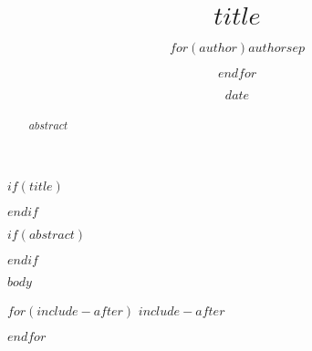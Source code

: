 \documentclass[twoside,symmetric]{tufte-handout}
\title{$title$}
\author{$for(author)$$author$$sep$ \and $endfor$}
\date{$date$}
\begin{document}
$if(title)$
\maketitle
$endif$
 
\bigskip

$if(abstract)$
\begin{abstract}
$abstract$
\end{abstract}
$endif$

$body$
 
$for(include-after)$
$include-after$
 
$endfor$
\end{document}
